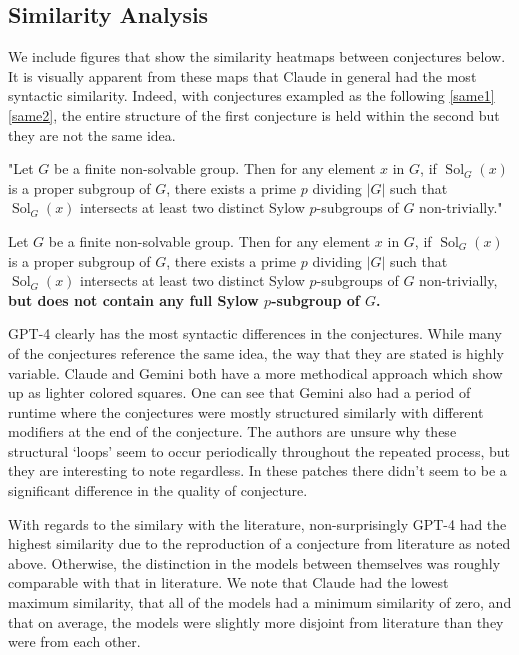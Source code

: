 \documentclass{article}
\begin{document}
\subsection{Similarity Analysis}\label{apsimilarity}
We include figures that show the similarity heatmaps between conjectures below. It is visually apparent from these maps that Claude in general had the most syntactic similarity. Indeed, with conjectures exampled as the following \ref{same1}\ref{same2}, the entire structure of the first conjecture is held within the second but they are not the same idea. 
\begin{conj}\label{same1}
    "Let $G$ be a finite non-solvable group. Then for any element $x$ in $G$, if $\operatorname{Sol}_G(x)$ is a proper subgroup of $G$, there exists a prime $p$ dividing $|G|$ such that $\operatorname{Sol}_G(x)$ intersects at least two distinct Sylow $p$-subgroups of $G$ non-trivially."
\end{conj}
\begin{conj}\label{same2}
    Let $G$ be a finite non-solvable group. Then for any element $x$ in $G$, if $\operatorname{Sol}_G(x)$ is a proper subgroup of $G$, there exists a prime $p$ dividing $|G|$ such that $\operatorname{Sol}_G(x)$ intersects at least two distinct Sylow $p$-subgroups of $G$ non-trivially, \textbf{but does not contain any full Sylow $p$-subgroup of $G$.}
\end{conj}
GPT-4 clearly has the most syntactic differences in the conjectures. While many of the conjectures reference the same idea, the way that they are stated is highly variable. Claude and Gemini both have a more methodical approach which show up as lighter colored squares. One can see that Gemini also had a period of runtime where the conjectures were mostly structured similarly with different modifiers at the end of the conjecture. The authors are unsure why these structural `loops' seem to occur periodically throughout the repeated process, but they are interesting to note regardless. In these patches there didn't seem to be a significant difference in the quality of conjecture. 

With regards to the similary with the literature, non-surprisingly GPT-4 had the highest similarity due to the reproduction of a conjecture from literature as  noted above. Otherwise, the distinction in the models between themselves was roughly comparable with that in literature. We note that Claude had the lowest maximum similarity, that all of the models had a minimum similarity of zero, and that on average, the models were slightly more disjoint from literature than they were from each other. 
\end{document}
